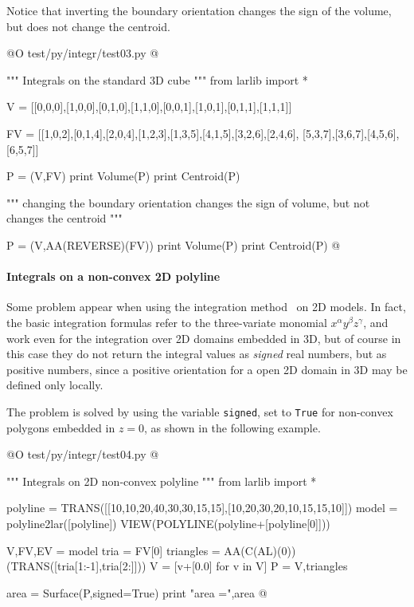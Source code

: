 \documentclass[11pt,oneside]{article}	%
\begin{document}
Notice that inverting the boundary orientation changes the sign of the volume, 
but does not change the centroid.

@O test/py/integr/test03.py
@{""" Integrals on the standard 3D cube """
from larlib import *

V = [[0,0,0],[1,0,0],[0,1,0],[1,1,0],[0,0,1],[1,0,1],[0,1,1],[1,1,1]]

FV = [[1,0,2],[0,1,4],[2,0,4],[1,2,3],[1,3,5],[4,1,5],[3,2,6],[2,4,6],
	  [5,3,7],[3,6,7],[4,5,6],[6,5,7]]

P = (V,FV)
print Volume(P)
print Centroid(P)

""" changing the boundary orientation changes the sign of volume,
	 but not changes the centroid """

P = (V,AA(REVERSE)(FV))
print Volume(P)
print Centroid(P)
@}


\paragraph{Integrals on a non-convex 2D polyline}

Some problem appear when using the integration method~\cite{CattaniP-BIL1990} on 2D models.
In fact, the basic integration formulas refer to the three-variate monomial $x^\alpha y^\beta z^\gamma$, 
and work even for the integration over 2D domains embedded in 3D, but of course in this case they do not return
the integral values as \emph{signed} real numbers, but as positive numbers, since a positive orientation for a open 2D domain in 3D may be defined only locally.

The problem is solved by using the variable \texttt{signed}, set to \texttt{True} for non-convex polygons embedded in $z=0$,
as shown in the following example.

@O test/py/integr/test04.py
@{""" Integrals on 2D non-convex polyline """
from larlib import *

polyline = TRANS([[10,10,20,40,30,30,15,15],[10,20,30,20,10,15,15,10]])
model = polyline2lar([polyline])
VIEW(POLYLINE(polyline+[polyline[0]]))

V,FV,EV = model
tria = FV[0]
triangles = AA(C(AL)(0))(TRANS([tria[1:-1],tria[2:]]))
V = [v+[0.0] for v in V]
P = V,triangles

area = Surface(P,signed=True)
print "area =",area
@}
\end{document}
